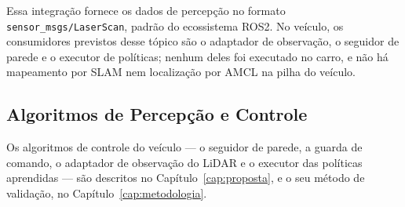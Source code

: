 Essa integração fornece os dados de percepção no formato
\texttt{sensor\_msgs/LaserScan}, padrão do ecossistema ROS2. No veículo, os
consumidores previstos desse tópico são o adaptador de observação, o seguidor de
parede e o executor de políticas; nenhum deles foi executado no carro, e não há
mapeamento por SLAM nem localização por AMCL na pilha do veículo.

\subsection{Algoritmos de Percepção e Controle}

Os algoritmos de controle do veículo --- o seguidor de parede, a guarda de
comando, o adaptador de observação do LiDAR e o executor das políticas
aprendidas --- são descritos no Capítulo~\ref{cap:proposta}, e o seu método de
validação, no Capítulo~\ref{cap:metodologia}.
